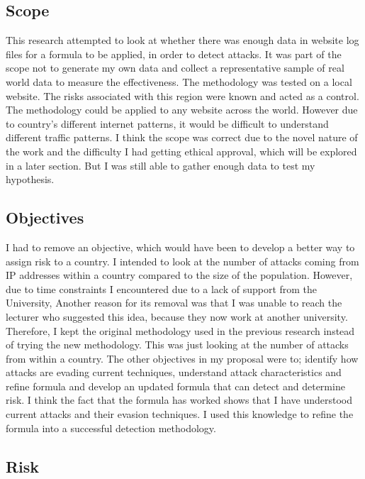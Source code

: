 \subsection{Scope}

This research attempted to look at whether there was enough data in website log files for a formula to be applied, in order to detect attacks. It was part of the scope not to generate my own data and collect a representative sample of real world data to measure the effectiveness. The methodology was tested on a local website. The risks associated with this region were known and acted as a control. The methodology could be applied to any website across the world. However due to country's different internet patterns, it would be difficult to understand different traffic patterns. I think the scope was correct due to the novel nature of the work and the difficulty I had getting ethical approval, which will be explored in a later section. But I was still able to gather enough data to test my hypothesis.


\subsection{Objectives}

I had to remove an objective, which would have been to develop a better way to assign risk to a country. I intended to look at the number of attacks coming from IP addresses within a country compared to the size of the population. However, due to time constraints I encountered due to a lack of support from the University, Another reason for its removal was that I was unable to reach the lecturer who suggested this idea, because they now work at another university. Therefore, I kept the original methodology used in the previous research instead of trying the new methodology. This was just looking at the number of attacks from within a country. The other objectives in my proposal were to; identify how attacks are evading current techniques, understand attack characteristics and refine formula and develop an updated formula that can detect and determine risk. I think the fact that the formula has worked shows that I have understood current attacks and their evasion techniques. I used this knowledge to refine the formula into a successful detection methodology.

\subsection{Risk}

